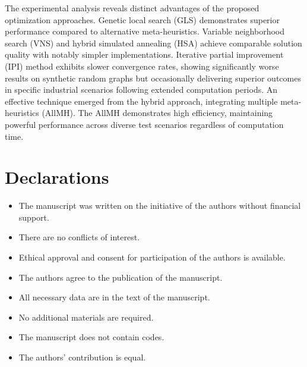 \documentclass[runningheads]{llncs}
\begin{document}
The experimental analysis reveals distinct advantages of the proposed optimization approaches. Genetic local search (GLS) demonstrates superior performance compared to alternative meta-heuristics. Variable neighborhood search (VNS) and hybrid simulated annealing (HSA) achieve comparable solution quality with notably simpler implementations. Iterative partial improvement (IPI) method exhibits slower convergence rates, showing significantly worse results on synthetic random graphs but occasionally delivering superior outcomes in specific industrial scenarios following extended computation periods. An effective technique emerged from the hybrid approach, integrating multiple meta-heuristics (AllMH). The AllMH demonstrates high efficiency, maintaining powerful performance across diverse test scenarios regardless of computation time.

\section*{Declarations}
\begin{itemize}
\item The manuscript was written on the initiative of the authors without financial support.
\item There are no conflicts of interest.
\item Ethical approval and consent for participation of the authors is available.
\item The authors agree to the publication of the manuscript.
\item All necessary data are in the text of the manuscript.
\item No additional materials are required.
\item The manuscript does not contain codes.
\item The authors' contribution is equal.
\end{itemize}
\end{document}
